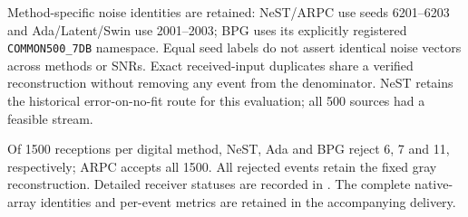 Method-specific noise identities are retained: NeST/ARPC use seeds 6201--6203 and Ada/Latent/Swin use 2001--2003; BPG uses its explicitly registered \texttt{COMMON500\_7DB} namespace. Equal seed labels do not assert identical noise vectors across methods or SNRs. Exact received-input duplicates share a verified reconstruction without removing any event from the denominator. NeST retains the historical error-on-no-fit route for this evaluation; all 500 sources had a feasible stream.

Of 1500 receptions per digital method, NeST, Ada and BPG reject 6, 7 and 11, respectively; ARPC accepts all 1500. All rejected events retain the fixed gray reconstruction. Detailed receiver statuses are recorded in . The complete native-array identities and per-event metrics are retained in the accompanying delivery.
